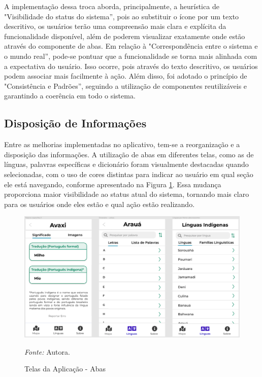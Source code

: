 A implementação dessa troca aborda, principalmente, a heurística de "Visibilidade do status do sistema'', pois ao substituir o ícone por um texto descritivo, os usuários terão uma compreensão mais clara e explícita da 
funcionalidade disponível, além de poderem visualizar exatamente onde estão através do componente de abas. Em relação à "Correspondência entre o sistema e o mundo real'', pode-se pontuar que a funcionalidade se torna mais 
alinhada com a expectativa do usuário. Isso ocorre, pois através do texto descritivo, os usuários podem associar mais facilmente à ação. Além disso, foi adotado o princípio de "Consistência e Padrões'', seguindo a utilização de componentes 
reutilizáveis e garantindo a coerência em todo o sistema. 

\subsection{Disposição de Informações}
\label{sec:Disposicao de Informacoes}

Entre as melhorias implementadas no aplicativo, tem-se a reorganização e a disposição das informações. A utilização de abas em diferentes telas, como as de línguas, palavras específicas e dicionário foram 
visualmente destacadas quando selecionadas, com o uso de cores distintas para indicar ao usuário em qual seção ele está navegando, conforme apresentado na Figura \ref{fig25}. Essa mudança proporciona maior visibilidade ao status atual do sistema, tornando mais 
claro para os usuários onde eles estão e qual ação estão realizando.

\begin{figure}[h!]
	\centering
	\caption{Telas da Aplicação - Abas}
	\begin{adjustbox}{center}
		\includegraphics[width=1\textwidth]{figuras/abas.eps}
	\end{adjustbox}
	\begin{tablenotes}[flushleft]
		\centering
		\item \textit{Fonte:} Autora.
	\end{tablenotes}
	\label{fig25}
\end{figure}

